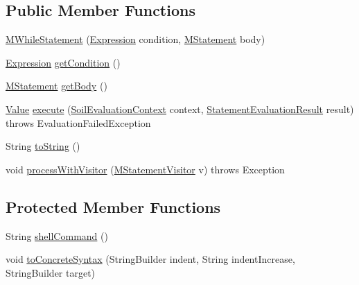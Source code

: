 \subsection*{Public Member Functions}
\begin{DoxyCompactItemize}
\item 
\hyperlink{classorg_1_1tzi_1_1use_1_1uml_1_1sys_1_1soil_1_1_m_while_statement_a5540b9408aed6c54e8c85caaa535cffa}{M\-While\-Statement} (\hyperlink{classorg_1_1tzi_1_1use_1_1uml_1_1ocl_1_1expr_1_1_expression}{Expression} condition, \hyperlink{classorg_1_1tzi_1_1use_1_1uml_1_1sys_1_1soil_1_1_m_statement}{M\-Statement} body)
\item 
\hyperlink{classorg_1_1tzi_1_1use_1_1uml_1_1ocl_1_1expr_1_1_expression}{Expression} \hyperlink{classorg_1_1tzi_1_1use_1_1uml_1_1sys_1_1soil_1_1_m_while_statement_a1684274162c9f3207e9b70be3d8b77b1}{get\-Condition} ()
\item 
\hyperlink{classorg_1_1tzi_1_1use_1_1uml_1_1sys_1_1soil_1_1_m_statement}{M\-Statement} \hyperlink{classorg_1_1tzi_1_1use_1_1uml_1_1sys_1_1soil_1_1_m_while_statement_a1a6cbbc6a77642bb79b9b2fa65f8d6fc}{get\-Body} ()
\item 
\hyperlink{classorg_1_1tzi_1_1use_1_1uml_1_1ocl_1_1value_1_1_value}{Value} \hyperlink{classorg_1_1tzi_1_1use_1_1uml_1_1sys_1_1soil_1_1_m_while_statement_a46cd639b6eafceccb367eccc9417ec0f}{execute} (\hyperlink{classorg_1_1tzi_1_1use_1_1uml_1_1sys_1_1soil_1_1_soil_evaluation_context}{Soil\-Evaluation\-Context} context, \hyperlink{classorg_1_1tzi_1_1use_1_1uml_1_1sys_1_1_statement_evaluation_result}{Statement\-Evaluation\-Result} result)  throws Evaluation\-Failed\-Exception 
\item 
String \hyperlink{classorg_1_1tzi_1_1use_1_1uml_1_1sys_1_1soil_1_1_m_while_statement_aa88a1ef0bb42eecff55c841298cb9350}{to\-String} ()
\item 
void \hyperlink{classorg_1_1tzi_1_1use_1_1uml_1_1sys_1_1soil_1_1_m_while_statement_a982f0483ab26294ece05f9d432b2fc97}{process\-With\-Visitor} (\hyperlink{interfaceorg_1_1tzi_1_1use_1_1uml_1_1sys_1_1soil_1_1_m_statement_visitor}{M\-Statement\-Visitor} v)  throws Exception 
\end{DoxyCompactItemize}
\subsection*{Protected Member Functions}
\begin{DoxyCompactItemize}
\item 
String \hyperlink{classorg_1_1tzi_1_1use_1_1uml_1_1sys_1_1soil_1_1_m_while_statement_aad0cff265d4b9cf9002c143f4421e5e7}{shell\-Command} ()
\item 
void \hyperlink{classorg_1_1tzi_1_1use_1_1uml_1_1sys_1_1soil_1_1_m_while_statement_a3751a2983795dd7c64a8c00a77426f9f}{to\-Concrete\-Syntax} (String\-Builder indent, String indent\-Increase, String\-Builder target)
\end{DoxyCompactItemize}


